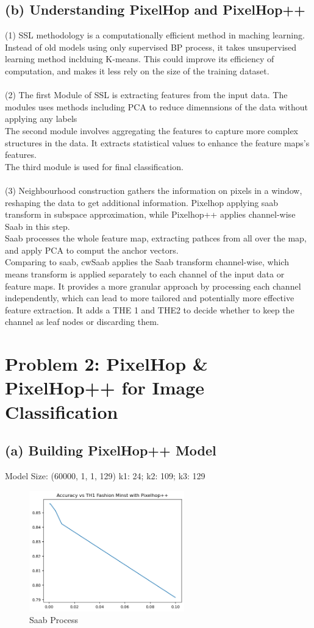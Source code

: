 \documentclass[12pt]{article}
\begin{document}
\subsection*{(b) Understanding PixelHop and PixelHop++}
	(1) SSL methodology is a computationally efficient method in maching learning. Instead of old models using only supervised BP process, it takes unsupervised learning method inclduing K-means. This could improve its efficiency of computation, and makes it less rely on the size of the training dataset. 
	\\\\
	(2) The first Module of SSL is extracting features from the input data. The modules uses methods including PCA to reduce dimennsions of the data without applying any labels\\
	The second module involves aggregating the features to capture more complex structures in the data. It extracts statistical values to enhance the feature maps's features.\\
	The third module is used for final classification. \\\\
	(3) Neighbourhood construction gathers the information on pixels in a window, reshaping the data to get additional information. Pixelhop applying saab transform in subspace approximation, while Pixelhop++ applies channel-wise Saab in this step.\\
	Saab processes the whole feature map, extracting pathces from all over the map, and apply PCA to comput the anchor vectors.\\
	 Comparing to saab, cwSaab applies the Saab transform channel-wise, which means transform is applied separately to each channel of the input data or feature maps. It provides a more granular approach by processing each channel independently, which can lead to more tailored and potentially more effective feature extraction. It adds a THE 1 and THE2 to decide whether to keep the channel as leaf nodes or discarding them. 
	\section*{Problem 2: PixelHop \& PixelHop++ for Image Classification}
	 \subsection*{(a) Building PixelHop++ Model}
	 Model Size: (60000, 1, 1, 129) k1:  24;	 k2:  109;
	 k3:  129 
	 \begin{figure}[H]
	 	\centering
	 	\includegraphics[width=0.6\textwidth]{FMINST++.png}
	 	\caption{Saab Process}
	 	\label{p2a}
	 \end{figure}
\end{document}
